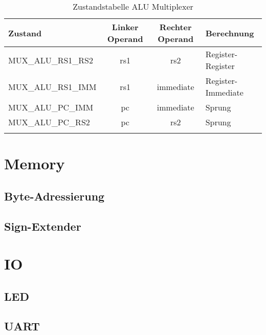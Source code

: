             \begin{center}
                \begin{longtable}{| l | c | c | l |}
                    \hline
                        Zustand & Linker Operand & Rechter Operand & Berechnung \\
                    \hline
                        MUX\_ALU\_RS1\_RS2 & rs1 & rs2 & Register-Register \\
                    \hline
                        MUX\_ALU\_RS1\_IMM & rs1 & immediate &  Register-Immediate\\
                    \hline
                        MUX\_ALU\_PC\_IMM & pc & immediate & Sprung \\
                    \hline
                        MUX\_ALU\_PC\_RS2 & pc & rs2 & Sprung \\
                    \hline
                    \caption[Zustandstabelle ALU Multiplexer]{Zustandstabelle ALU Multiplexer}
                    \label{tab:alu-mux}
                \end{longtable}
            \end{center}

            
            

    \section{Memory}
        \subsection{Byte-Adressierung}
        \subsection{Sign-Extender}

    \section{IO}
        \subsection{LED}
        \subsection{UART}